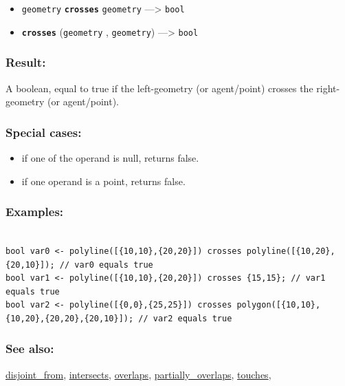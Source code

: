 \documentclass[]{book}
\providecommand{\tightlist}{%
  \setlength{\itemsep}{0pt}\setlength{\parskip}{0pt}}
\theoremstyle{definition}
\theoremstyle{definition}
\theoremstyle{definition}
\theoremstyle{remark}
\begin{document}
\begin{itemize}
\tightlist
\item
  \texttt{geometry} \textbf{\texttt{crosses}} \texttt{geometry}
  ---\textgreater{} \texttt{bool}
\item
  \textbf{\texttt{crosses}} (\texttt{geometry} , \texttt{geometry})
  ---\textgreater{} \texttt{bool}
\end{itemize}

\subsubsection{Result:}\label{result-114}

A boolean, equal to true if the left-geometry (or agent/point) crosses
the right-geometry (or agent/point).

\subsubsection{Special cases:}\label{special-cases-44}

\begin{itemize}
\tightlist
\item
  if one of the operand is null, returns false.\\
\item
  if one operand is a point, returns false.
\end{itemize}

\subsubsection{Examples:}\label{examples-89}

\begin{verbatim}
 
bool var0 <- polyline([{10,10},{20,20}]) crosses polyline([{10,20},{20,10}]); // var0 equals true 
bool var1 <- polyline([{10,10},{20,20}]) crosses {15,15}; // var1 equals true 
bool var2 <- polyline([{0,0},{25,25}]) crosses polygon([{10,10},{10,20},{20,20},{20,10}]); // var2 equals true
\end{verbatim}

\subsubsection{See also:}\label{see-also-72}

\href{operators-d-to-h.html\#disjoint_from}{disjoint\_from},
\href{operators-i-to-m.html\#intersects}{intersects},
\href{operators-n-to-r.html\#overlaps}{overlaps},
\href{operators-n-to-r.html\#partially_overlaps}{partially\_overlaps},
\href{operators-s-to-z.html\#touches}{touches},
\end{document}
